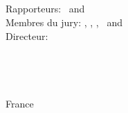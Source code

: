 \hfill
\vfill
{\small
\textbf{\thesisName} \\
\textit{\thesisTitleFr} \\
\thesisSubjectFr\\
\thesisDateFr \\
Rapporteurs: \thesisFirstReviewer\ and \thesisSecondReviewer \\
Membres du jury: \thesisPresident, \thesisFirstReviewer, \thesisSecondReviewer, \thesisExaminator\ and \thesisFirstSupervisor\\
Directeur: \thesisFirstSupervisor\\[1.5em]
\textbf{\thesisUniversity} \\
\thesisUniversityDepartment \\
\thesisUniversityStreetAddress \\
\thesisUniversityPostalCode\ \thesisUniversityCity\\
France
}
